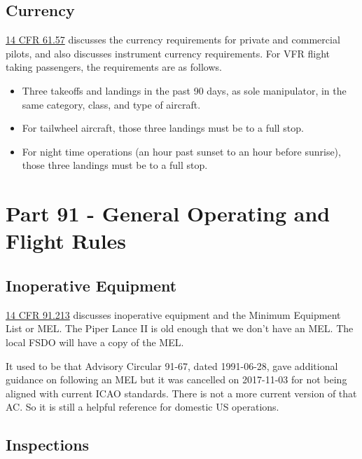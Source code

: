 \subsection{Currency}

\href{https://www.ecfr.gov/current/title-14/chapter-I/subchapter-D/part-61/subpart-A/section-61.57}{14 CFR 61.57} discusses the currency requirements for private and commercial pilots, and also discusses instrument currency requirements. For VFR flight taking passengers, the requirements are as follows.

\begin{itemize}
\item Three takeoffs and landings in the past 90 days, as sole manipulator, in the same category, class, and type of aircraft.
\item For tailwheel aircraft, those three landings must be to a full stop.
\item For night time operations (an hour past sunset to an hour before sunrise), those three landings must be to a full stop.

\end{itemize}

\section{Part 91 - General Operating and Flight Rules}

\subsection{Inoperative Equipment}

\href{https://www.ecfr.gov/current/title-14/chapter-I/subchapter-F/part-91/subpart-C/section-91.213}{14 CFR 91.213} discusses inoperative equipment and the Minimum Equipment List or MEL. The Piper Lance II is old enough that we don't have an MEL. The local FSDO will have a copy of the MEL.

It used to be that Advisory Circular 91-67, dated 1991-06-28, gave additional guidance on following an MEL but it was cancelled on 2017-11-03 for not being aligned with current ICAO standards. There is not a more current version of that AC. So it is still a helpful reference for domestic US operations.

\subsection{Inspections}

